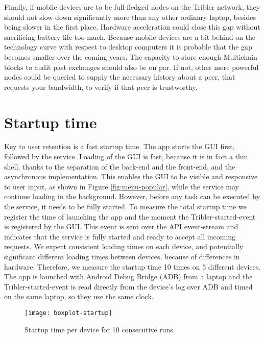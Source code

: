 Finally, if mobile devices are to be full-fledged nodes on the Tribler network, they should not slow down significantly more than any other ordinary laptop, besides being slower in the first place.
Hardware acceleration could close this gap without sacrificing battery life too much.
Because mobile devices are a bit behind on the technology curve with respect to desktop computers it is probable that the gap becomes smaller over the coming years.
The capacity to store enough Multichain blocks to audit past exchanges should also be on par.
If not, other more powerful nodes could be queried to supply the necessary history about a peer, that requests your bandwidth, to verify if that peer is trustworthy.


\section{Startup time}\label{sec:startup_time}
Key to user retention is a fast startup time.
The app starts the GUI first, followed by the service.
Loading of the GUI is fast, because it is in fact a thin shell, thanks to the separation of the back-end and the front-end, and the asynchronous implementation.
This enables the GUI to be visible and responsive to user input, as shown in Figure \ref{fig:menu-popular}, while the service may continue loading in the background.
However, before any task can be executed by the service, it needs to be fully started.
To measure the total startup time we register the time of launching the app and the moment the Tribler-started-event is registered by the GUI.
This event is sent over the API event-stream and indicates that the service is fully started and ready to accept all incoming requests.
We expect consistent loading times on each device, and potentially significant different loading times between devices, because of differences in hardware.
Therefore, we measure the startup time 10 times on 5 different devices.
The app is launched with Android Debug Bridge (ADB) from a laptop and the Tribler-started-event is read directly from the device's log over ADB and timed on the same laptop, so they use the same clock.
\begin{figure}[H]
	\centering %
	\texttt{[image: boxplot-startup]}
	\caption{Startup time per device for 10 consecutive runs.}
	\label{fig:boxplot-startup}
\end{figure}
